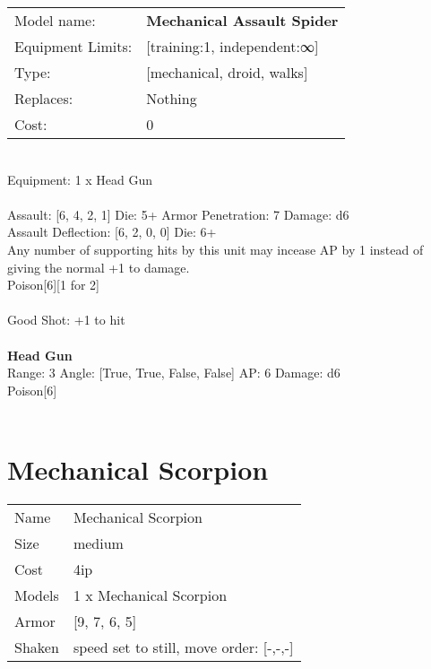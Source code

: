 \noindent
\begin{tabular}{ll}
Model name: &{\bf Mechanical Assault Spider } \\
Equipment Limits: &[training:1, independent:∞] \\
Type: &[mechanical, droid, walks] \\
Replaces: &Nothing \\
Cost: & 0\\
\end{tabular}
\ \\
Equipment: 1 x Head Gun \\
\ \\
Assault: [6, 4, 2, 1] Die: 5+ Armor Penetration: 7 Damage: d6 \\
Assault Deflection: [6, 2, 0, 0] Die: 6+\\
\indent Any number of supporting hits by this unit may incease AP by 1 instead of giving the normal +1 to damage.\\ 
Poison[6][1 for 2]\\ 
 
\ \\
Good Shot: +1 to hit\\ 

\ \\
{\bf Head Gun } \\



Range: 3  Angle: [True, True, False, False] AP: 6 Damage: d6 \\
Poison[6]\\ 




 
\ \\













\clearpage

\section{ Mechanical Scorpion }

\begin{tabular}{ll}
  Name & Mechanical Scorpion \\
  Size & medium\\
  Cost & 4ip\\
  Models & 1 x Mechanical Scorpion\\
  Armor & [9, 7, 6, 5]\\
  Shaken & speed set to still, move order: [-,-,-]\\
\end{tabular}

